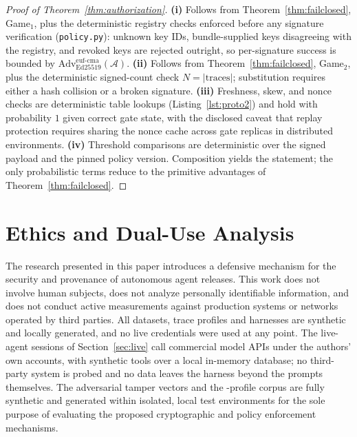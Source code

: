 \documentclass[letterpaper,10pt,twocolumn]{article}
\theoremstyle{definition}
\begin{document}
\begin{proof}[Proof of Theorem~\ref{thm:authorization}]
\textbf{(i)} Follows from Theorem~\ref{thm:failclosed}, Game$_1$, plus the deterministic registry checks enforced before any signature verification (\texttt{policy.py}): unknown key IDs, bundle-supplied keys disagreeing with the registry, and revoked keys are rejected outright, so per-signature success is bounded by $\text{Adv}_{\text{Ed25519}}^{\text{euf-cma}}(\mathcal{A})$. \textbf{(ii)} Follows from Theorem~\ref{thm:failclosed}, Game$_2$, plus the deterministic signed-count check $N = |\text{traces}|$; substitution requires either a hash collision or a broken signature. \textbf{(iii)} Freshness, skew, and nonce checks are deterministic table lookups (Listing~\ref{lst:proto2}) and hold with probability $1$ given correct gate state, with the disclosed caveat that replay protection requires sharing the nonce cache across gate replicas in distributed environments. \textbf{(iv)} Threshold comparisons are deterministic over the signed payload and the pinned policy version. Composition yields the statement; the only probabilistic terms reduce to the primitive advantages of Theorem~\ref{thm:failclosed}.
\end{proof}

\section{Ethics and Dual-Use Analysis}\label{sec:appendix_ethics}
The research presented in this paper introduces a defensive mechanism for the security and provenance of autonomous agent releases. This work does not involve human subjects, does not analyze personally identifiable information, and does not conduct active measurements against production systems or networks operated by third parties. All datasets, trace profiles and harnesses are synthetic and locally generated, and no live credentials were used at any point. The live-agent sessions of Section~\ref{sec:live} call commercial model APIs under the authors' own accounts, with synthetic tools over a local in-memory database; no third-party system is probed and no data leaves the harness beyond the prompts themselves. The \scoredVectors{} adversarial tamper vectors and the \corpusProfiles{}-profile corpus are fully synthetic and generated within isolated, local test environments for the sole purpose of evaluating the proposed cryptographic and policy enforcement mechanisms. 
\end{document}
